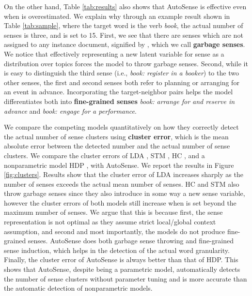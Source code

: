 \documentclass[letterpaper]{article} \usepackage{aaai19}
\begin{document}
On the other hand, Table \ref{tab:results} also shows that AutoSense is effective even when  is overestimated. We explain why through an example result shown in Table \ref{tab:sample}, where the target word is the verb \textit{book}, the actual number of senses is three, and  is set to 15. First, we see that there are senses which are not assigned to any instance document, signified by , which we call \textbf{garbage senses}. We notice that effectively representing a new latent variable for sense as a distribution over topics forces the model to throw garbage senses. Second, while it is easy to distinguish the third sense (i.e., \textit{book: register in a booker}) to the two other senses, the first and second senses both refer to planning or arranging for an event in advance. Incorporating the target-neighbor pairs helps the model differentiates both into \textbf{fine-grained senses} \textit{book: arrange for and reserve in advance} and \textit{book: engage for a performance}.

We compare the competing models quantitatively on how they correctly detect the actual number of sense clusters using \textbf{cluster error}, which is the mean absolute error between the detected number and the actual number of sense clusters. We compare the cluster errors of LDA \cite{blei2003latent}, STM \cite{wang2015sense}, HC \cite{chang2014inducing}, and a nonparametric model HDP \cite{teh2004sharing}, with AutoSense. We report the results in Figure \ref{fig:clusters}. Results show that the cluster error of LDA increases sharply as the number of senses exceeds the actual mean number of senses. HC and STM also throw garbage senses since they also introduce in some way a new sense variable, however the cluster errors of both models still increase when  is set beyond the maximum number of senses. We argue that this is because first, the sense representation is not optimal as they assume strict local/global context assumption, and second and most importantly, the models do not produce fine-grained senses. AutoSense does both garbage sense throwing and fine-grained sense induction, which helps in the detection of the actual word granularity. Finally, the cluster error of AutoSense is always better than that of HDP. This shows that AutoSense, despite being a parametric model, automatically detects the number of sense clusters without parameter tuning and is more accurate than the automatic detection of nonparametric models.
\end{document}

